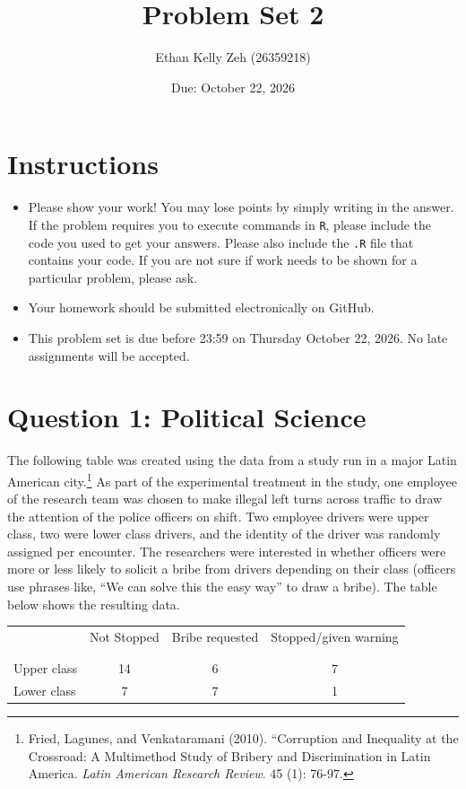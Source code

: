 \documentclass[12pt,letterpaper]{article}
\title{Problem Set 2}
\date{Due: October 22, 2026}
\author{Ethan Kelly Zeh (26359218)}
\begin{document}
	\maketitle
	\section*{Instructions}
\begin{itemize}
	\item Please show your work! You may lose points by simply writing in the answer. If the problem requires you to execute commands in \texttt{R}, please include the code you used to get your answers. Please also include the \texttt{.R} file that contains your code. If you are not sure if work needs to be shown for a particular problem, please ask.
	\item Your homework should be submitted electronically on GitHub.
	\item This problem set is due before 23:59 on Thursday October 22, 2026. No late assignments will be accepted.

\end{itemize}

	
	\vspace{.5cm}
	\section*{Question 1: Political Science}
		\vspace{.25cm}
	The following table was created using the data from a study run in a major Latin American city.\footnote{Fried, Lagunes, and Venkataramani (2010). ``Corruption and Inequality at the Crossroad: A Multimethod Study of Bribery and Discrimination in Latin America. \textit{Latin American Research Review}. 45 (1): 76-97.} As part of the experimental treatment in the study, one employee of the research team was chosen to make illegal left turns across traffic to draw the attention of the police officers on shift. Two employee drivers were upper class, two were lower class drivers, and the identity of the driver was randomly assigned per encounter. The researchers were interested in whether officers were more or less likely to solicit a bribe from drivers depending on their class (officers use phrases like, ``We can solve this the easy way'' to draw a bribe). The table below shows the resulting data.

\newpage
\begin{table}[h!]
	\centering
	\begin{tabular}{l | c c c }
		& Not Stopped & Bribe requested & Stopped/given warning \\
		\\[-1.8ex] 
		\hline \\[-1.8ex]
		Upper class & 14 & 6 & 7 \\
		Lower class & 7 & 7 & 1 \\
		\hline
	\end{tabular}
\end{table}
\end{document}
